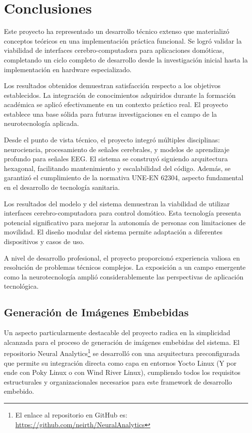 \chapter*{Conclusiones}

Este proyecto ha representado un desarrollo técnico extenso que materializó conceptos teóricos en una implementación práctica funcional. Se logró validar la viabilidad de interfaces cerebro-computadora para aplicaciones domóticas, completando un ciclo completo de desarrollo desde la investigación inicial hasta la implementación en hardware especializado.

Los resultados obtenidos demuestran satisfacción respecto a los objetivos establecidos. La integración de conocimientos adquiridos durante la formación académica se aplicó efectivamente en un contexto práctico real. El proyecto establece una base sólida para futuras investigaciones en el campo de la neurotecnología aplicada.

Desde el punto de vista técnico, el proyecto integró múltiples disciplinas: neurociencia, procesamiento de señales cerebrales, y modelos de aprendizaje profundo para señales EEG. El sistema se construyó siguiendo arquitectura hexagonal, facilitando mantenimiento y escalabilidad del código. Además, se garantizó el cumplimiento de la normativa UNE-EN 62304, aspecto fundamental en el desarrollo de tecnología sanitaria.

Los resultados del modelo y del sistema demuestran la viabilidad de utilizar interfaces cerebro-computadora para control domótico. Esta tecnología presenta potencial significativo para mejorar la autonomía de personas con limitaciones de movilidad. El diseño modular del sistema permite adaptación a diferentes dispositivos y casos de uso.

A nivel de desarrollo profesional, el proyecto proporcionó experiencia valiosa en resolución de problemas técnicos complejos. La exposición a un campo emergente como la neurotecnología amplió considerablemente las perspectivas de aplicación tecnológica.

\newpage
\section*{Generación de Imágenes Embebidas}

Un aspecto particularmente destacable del proyecto radica en la simplicidad alcanzada para el proceso de generación de imágenes embebidas del sistema. El repositorio Neural Analytics\footnote{El enlace al repositorio en GitHub es: \url{https://github.com/neirth/NeuralAnalytics}} se desarrolló con una arquitectura preconfigurada que permite su integración directa como capa en entornos Yocto Linux (Y por ende con Poky Linux o con Wind River Linux), cumpliendo todos los requisitos estructurales y organizacionales necesarios para este framework de desarrollo embebido.

